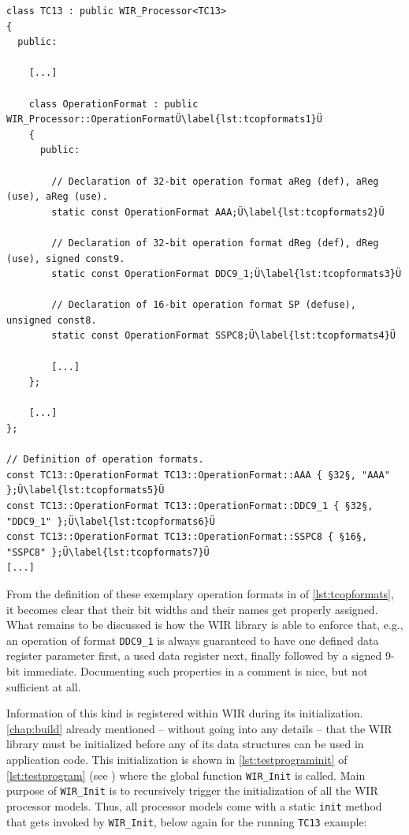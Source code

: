 \begin{lstlisting}[style=code,float=t,caption={Concrete Operation Format Handling (here for Class \texttt{TC13})},label=lst:tcopformats]
class TC13 : public WIR_Processor<TC13>
{
  public:

    [...]

    class OperationFormat : public WIR_Processor::OperationFormatÜ\label{lst:tcopformats1}Ü
    {
      public:

        // Declaration of 32-bit operation format aReg (def), aReg (use), aReg (use).
        static const OperationFormat AAA;Ü\label{lst:tcopformats2}Ü

        // Declaration of 32-bit operation format dReg (def), dReg (use), signed const9.
        static const OperationFormat DDC9_1;Ü\label{lst:tcopformats3}Ü

        // Declaration of 16-bit operation format SP (defuse), unsigned const8.
        static const OperationFormat SSPC8;Ü\label{lst:tcopformats4}Ü

        [...]
    };

    [...]
};

// Definition of operation formats.
const TC13::OperationFormat TC13::OperationFormat::AAA { §32§, "AAA" };Ü\label{lst:tcopformats5}Ü
const TC13::OperationFormat TC13::OperationFormat::DDC9_1 { §32§, "DDC9_1" };Ü\label{lst:tcopformats6}Ü
const TC13::OperationFormat TC13::OperationFormat::SSPC8 { §16§, "SSPC8" };Ü\label{lst:tcopformats7}Ü
[...]
\end{lstlisting}

From the definition of these exemplary operation formats in  of \cref{lst:tcopformats}, it becomes clear that their bit widths and their names get properly assigned.
What remains to be discussed is how the \gls{WIR} library is able to enforce that, e.g., an operation of format \texttt{DDC9\_1} is always guaranteed to have one defined data register parameter first, a used data register next, finally followed by a signed 9-bit immediate.
Documenting such properties in a comment is nice, but not sufficient at all.

Information of this kind is registered within \gls{WIR} during its initialization.
\cref{chap:build} already mentioned -- without going into any details -- that the \gls{WIR} library must be initialized before any of its data structures can be used in application code.
This initialization is shown in \cref{lst:testprograminit} of \cref{lst:testprogram} (see ) where the global function \texttt{WIR\_Init} is called.
Main purpose of \texttt{WIR\_Init} is to recursively trigger the initialization of all the \gls{WIR} processor models.
Thus, all processor models come with a static \texttt{init} method that gets invoked by \texttt{WIR\_Init}, below again for the running \texttt{TC13} example:

